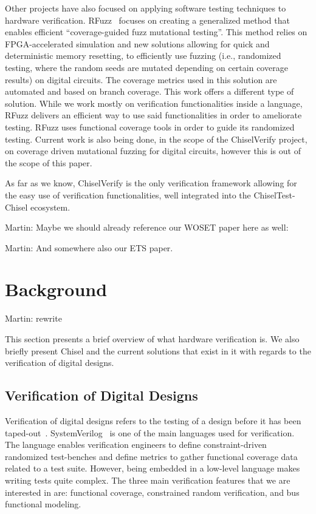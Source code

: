 \documentclass[conference]{IEEEtran}
\newcommand{\martin}[1]{{\color{blue} Martin: #1}}
\begin{document}
Other projects have also focused on applying software testing techniques to hardware verification. 
RFuzz~\cite{rfuzz2018} focuses on creating a generalized method that enables efficient ``coverage-guided fuzz mutational testing''. 
This method relies on FPGA-accelerated simulation and new solutions allowing for quick and deterministic memory resetting, to efficiently use fuzzing (i.e., randomized testing, where the random seeds are mutated depending on certain coverage results) on digital circuits. 
The coverage metrics used in this solution are automated and based on branch coverage. 
This work offers a different type of solution. 
While we work mostly on verification functionalities inside a language, RFuzz delivers an efficient way to use said functionalities in order to ameliorate testing. 
RFuzz uses functional coverage tools in order to guide its randomized testing. 
Current work is also being done, in the scope of the ChiselVerify project, on coverage driven mutational fuzzing for digital circuits, however this is out of the scope of this paper.


As far as we know, ChiselVerify is the only verification framework allowing for the easy use of verification functionalities, well integrated into the ChiselTest-Chisel ecosystem.

\martin{Maybe we should already reference our WOSET paper here as well: \cite{verify:fuzzing:2021}}

\martin{And somewhere also our ETS paper.}

\section{Background}
\label{sec:background}

\martin{rewrite}


This section presents a brief overview of what hardware verification is. 
We also briefly present Chisel and the current solutions that exist in it with regards to the verification of digital designs.

\subsection{Verification of Digital Designs}
Verification of digital designs refers to the testing of a design before it has been taped-out~\cite{spear2008systemverilog}. 
SystemVerilog~\cite{SystemVerilog} is one of the main languages used for verification.
The language enables verification engineers to define constraint-driven randomized test-benches and define metrics to gather functional coverage data related to a test suite. 
However, being embedded in a low-level language makes writing tests quite complex. 
The three main verification features that we are interested in are: functional coverage, constrained random verification, and bus functional modeling.
\end{document}

